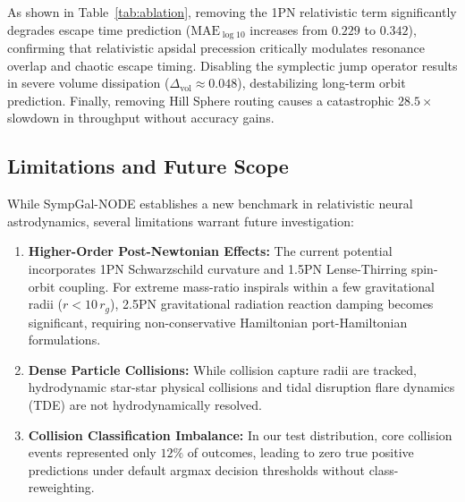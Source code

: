 \documentclass[preprint,12pt,3p]{elsarticle}
\begin{document}
\begin{table}[h]
\centering
\caption{Ablation Study of Architectural Components on Regime A.}
\label{tab:ablation}
\end{table}

As shown in Table~\ref{tab:ablation}, removing the 1PN relativistic term significantly degrades escape time prediction ($\mathrm{MAE}_{\log 10}$ increases from $0.229$ to $0.342$), confirming that relativistic apsidal precession critically modulates resonance overlap and chaotic escape timing. Disabling the symplectic jump operator results in severe volume dissipation ($\Delta_{\mathrm{vol}} \approx 0.048$), destabilizing long-term orbit prediction. Finally, removing Hill Sphere routing causes a catastrophic $28.5\times$ slowdown in throughput without accuracy gains.

\subsection{Limitations and Future Scope}
While SympGal-NODE establishes a new benchmark in relativistic neural astrodynamics, several limitations warrant future investigation:
\begin{enumerate}
    \item \textbf{Higher-Order Post-Newtonian Effects:} The current potential incorporates 1PN Schwarzschild curvature and 1.5PN Lense-Thirring spin-orbit coupling. For extreme mass-ratio inspirals within a few gravitational radii ($r < 10\,r_g$), 2.5PN gravitational radiation reaction damping becomes significant, requiring non-conservative Hamiltonian port-Hamiltonian formulations.
    \item \textbf{Dense Particle Collisions:} While collision capture radii are tracked, hydrodynamic star-star physical collisions and tidal disruption flare dynamics (TDE) are not hydrodynamically resolved.
    \item \textbf{Collision Classification Imbalance:} In our test distribution, core collision events represented only $12\%$ of outcomes, leading to zero true positive predictions under default argmax decision thresholds without class-reweighting.
\end{enumerate}
\end{document}
